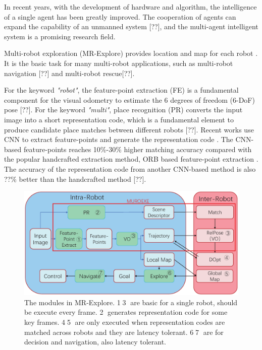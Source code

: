 \label{sec:intro}

In recent years, with the development of hardware and algorithm, the intelligence of a single agent has been greatly improved.
The cooperation of agents can expand the capability of an unmanned system [??], and the multi-agent intelligent system is a promising research field.

Multi-robot exploration (MR-Explore) \cite{corah2019communication} provides location and map for each robot . It is the basic task for many multi-robot applications, such as multi-robot navigation [??] and multi-robot rescue[??].

For the keyword \textit{"robot"}, the feature-point extraction (FE) is a fundamental component for the visual odometry to estimate the 6 degrees of freedom (6-DoF) pose [??].
For the keyword \textit{"multi"}, place recognition (PR) converts the input image into a short representation code, which is a fundamental element to produce candidate place matches between different robots [??].
Recent works use CNN to extract feature-points \cite{detone2018superpoint, simo2015discriminative, yi2016lift} and generate the representation code \cite{arandjelovic2016netvlad, radenovic2018fine}. 
The CNN-based feature-points \cite{detone2018superpoint} reaches 10\%-30\% higher matching accuracy compared with the popular handcrafted extraction method, ORB based feature-point extraction \cite{Mur-Artal:2017281}.
The accuracy of the representation code from another CNN-based method \cite{radenovic2018fine} is also ??\% better than the handcrafted method [??].

\begin{figure}[t]
	\centering
	\includegraphics[width=0.99\linewidth]{fig/maexp.eps}
    \caption{
        The modules in MR-Explore. \textcircled{1}\textcircled{3} are basic for a single robot, should be execute every frame. \textcircled{2} generates representation code for some key frames. \textcircled{4}\textcircled{5} are only executed when representation codes are matched across robots and they are latency tolerant.  \textcircled{6}\textcircled{7} are for decision and navigation, also latency tolerant.
    }
	\label{fig:maexp}
\end{figure}


